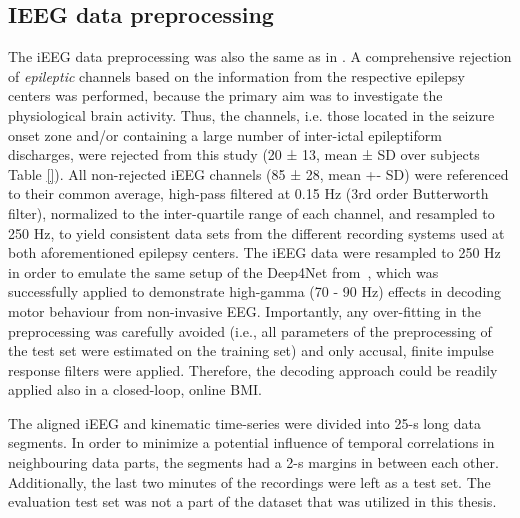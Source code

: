 \subsection{IEEG data preprocessing}\label{subsec:ieeg-data-preprocessing}
The iEEG data preprocessing was also the same as in \cite{Hammer-2021}.
A comprehensive rejection of \textit{epileptic} channels based on the information from the respective epilepsy centers was performed, because the primary aim was to investigate the physiological brain activity.
Thus, the channels, i.e. those located in the seizure onset zone and/or containing a large number of inter-ictal epileptiform discharges, were rejected from this study (20 ± 13, mean ± SD over subjects Table \ref{}).
All non-rejected iEEG channels (85 ± 28, mean +- SD) were referenced to their common average, high-pass filtered at 0.15 Hz (3rd order Butterworth filter), normalized to the inter-quartile range of each channel, and resampled to 250 Hz, to yield consistent data sets from the different recording systems used at both aforementioned epilepsy centers.
The iEEG data were resampled to 250 Hz in order to emulate the same setup of the Deep4Net from~\cite{schirrmeister-deep-2017}, which was successfully applied to demonstrate high-gamma (70 - 90 Hz) effects in decoding motor behaviour from non-invasive EEG. Importantly, any over-fitting in the preprocessing was carefully avoided (i.e., all parameters of the preprocessing of the test set were estimated on the training set) and only accusal, finite impulse response filters were applied.
Therefore, the decoding approach could be readily applied also in a closed-loop, online BMI.

The aligned iEEG and kinematic time-series were divided into 25-s long data segments.
In order to minimize a potential influence of temporal correlations in neighbouring data parts, the segments had a 2-s margins in between each other. Additionally, the last two minutes of the recordings were left as a test set. The evaluation test set was not a part of the dataset that was utilized in this thesis.

